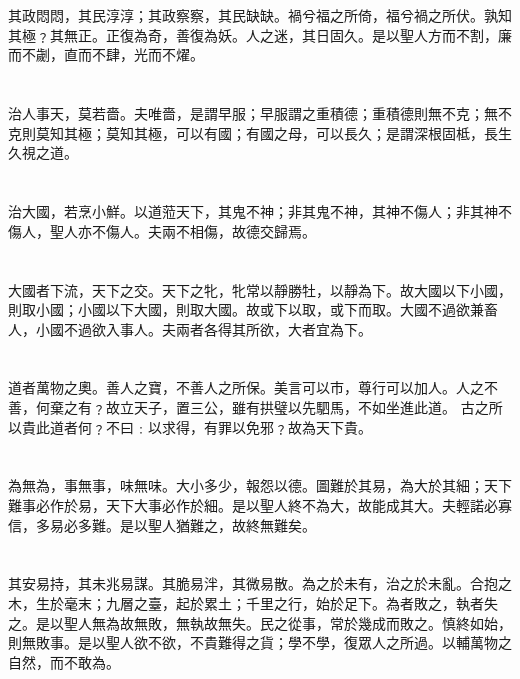 \documentclass[11pt,oneside]{article}
\begin{document}
\section{}
\label{sec:orgheadline57}
其政悶悶，其民淳淳；其政察察，其民缺缺。禍兮福之所倚，福兮禍之所伏。孰知其極﹖其無正。正復為奇，善復為妖。人之迷，其日固久。是以聖人方而不割，廉而不劌，直而不肆，光而不燿。

\section{}
\label{sec:orgheadline58}
治人事天，莫若嗇。夫唯嗇，是謂早服；早服謂之重積德；重積德則無不克；無不克則莫知其極；莫知其極，可以有國；有國之母，可以長久；是謂深根固柢，長生久視之道。

\section{}
\label{sec:orgheadline59}
治大國，若烹小鮮。以道蒞天下，其鬼不神；非其鬼不神，其神不傷人；非其神不傷人，聖人亦不傷人。夫兩不相傷，故德交歸焉。

\section{}
\label{sec:orgheadline60}
大國者下流，天下之交。天下之牝，牝常以靜勝牡，以靜為下。故大國以下小國，則取小國；小國以下大國，則取大國。故或下以取，或下而取。大國不過欲兼畜人，小國不過欲入事人。夫兩者各得其所欲，大者宜為下。

\section{}
\label{sec:orgheadline61}
道者萬物之奧。善人之寶，不善人之所保。美言可以市，尊行可以加人。人之不善，何棄之有﹖故立天子，置三公，雖有拱璧以先駟馬，不如坐進此道。 古之所以貴此道者何﹖不曰﹕以求得，有罪以免邪﹖故為天下貴。

\section{}
\label{sec:orgheadline62}
為無為，事無事，味無味。大小多少，報怨以德。圖難於其易，為大於其細；天下難事必作於易，天下大事必作於細。是以聖人終不為大，故能成其大。夫輕諾必寡信，多易必多難。是以聖人猶難之，故終無難矣。

\section{}
\label{sec:orgheadline63}
其安易持，其未兆易謀。其脆易泮，其微易散。為之於未有，治之於未亂。合抱之木，生於毫末；九層之臺，起於累土；千里之行，始於足下。為者敗之，執者失之。是以聖人無為故無敗，無執故無失。民之從事，常於幾成而敗之。慎終如始，則無敗事。是以聖人欲不欲，不貴難得之貨；學不學，復眾人之所過。以輔萬物之自然，而不敢為。
\end{document}
